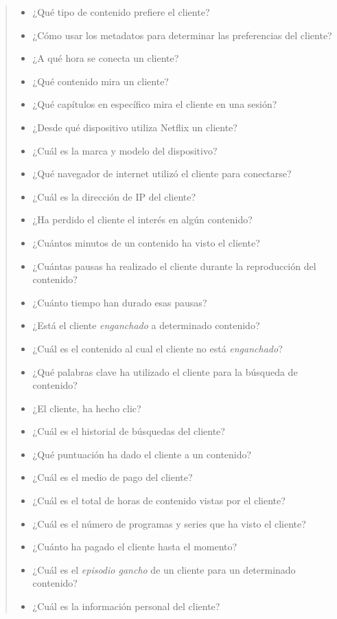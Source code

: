 \documentclass[a4paper,10pt,twoside,final,spanish]{article}
\begin{document}
\begin{quote}
\begin{itemize}
	\begin{itemize}
	\item ¿Qué tipo de contenido prefiere el cliente?
	\item ¿Cómo usar los metadatos para determinar las preferencias del cliente?
	\item ¿A qué hora se conecta un cliente?
	\item ¿Qué contenido mira un cliente?
	\item ¿Qué capítulos en específico mira el cliente en una sesión?
	\item ¿Desde qué dispositivo utiliza Netflix un cliente?
	\item ¿Cuál es la marca y modelo del dispositivo?
	\item ¿Qué navegador de internet utilizó el cliente para conectarse?
	\item ¿Cuál es la dirección de IP del cliente?
	\item ¿Ha perdido el cliente el interés en algún contenido?
	\item ¿Cuántos minutos de un contenido ha visto el cliente?
	\item ¿Cuántas pausas ha realizado el cliente durante la reproducción del 				contenido?
	\item ¿Cuánto tiempo han durado esas pausas?
	\item ¿Está el cliente \textit{enganchado} a determinado contenido?
	\item ¿Cuál es el contenido al cual el cliente no está \textit{enganchado}?
	\item ¿Qué palabras clave ha utilizado el cliente para la búsqueda de contenido?
	\item ¿El cliente, ha hecho clic?
	\item ¿Cuál es el historial de búsquedas del cliente?
	\item ¿Qué puntuación ha dado el cliente a un contenido?
	\item ¿Cuál es el medio de pago del cliente?
	\item ¿Cuál es el total de horas de contenido vistas por el cliente?
	\item ¿Cuál es el número de programas y series que ha visto el cliente?
	\item ¿Cuánto ha pagado el cliente hasta el momento?
	\item ¿Cuál es el \textit{episodio gancho} de un cliente para un determinado 			contenido?
	\item ¿Cuál es la información personal del cliente?
	\end{itemize}

\end{itemize}

\end{quote}
\end{document}
